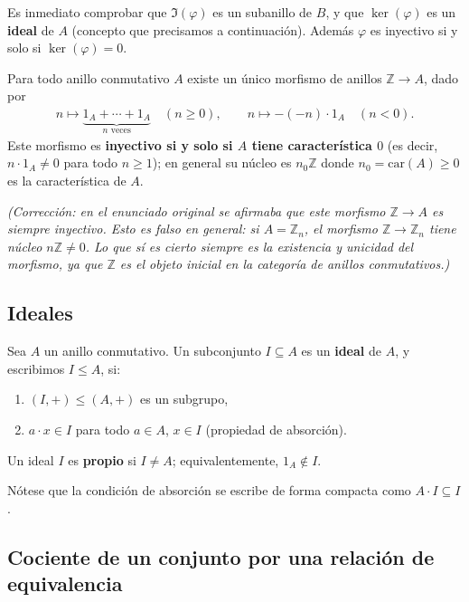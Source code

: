Es inmediato comprobar que $\Im(\varphi)$ es un subanillo de $B$, y que $\ker(\varphi)$ es un \textbf{ideal} de $A$ (concepto que precisamos a continuación). Además $\varphi$ es inyectivo si y solo si $\ker(\varphi)=0$.

\begin{prop}
Para todo anillo conmutativo $A$ existe un único morfismo de anillos $\mathbb{Z}\to A$, dado por
\begin{gather*}
    n \mapsto \underbrace{1_A + \cdots + 1_A}_{n \text{ veces}} \quad (n\geq 0), \qquad
    n \mapsto -(-n)\cdot 1_A \quad (n<0).
\end{gather*}
Este morfismo es \textbf{inyectivo si y solo si $A$ tiene característica $0$} (es decir, $n\cdot 1_A\neq 0$ para todo $n\geq 1$); en general su núcleo es $n_0\mathbb{Z}$ donde $n_0=\mathrm{car}(A)\geq 0$ es la característica de $A$.
\end{prop}

\emph{(Corrección: en el enunciado original se afirmaba que este morfismo $\mathbb{Z}\to A$ es siempre inyectivo. Esto es falso en general: si $A=\mathbb{Z}_n$, el morfismo $\mathbb{Z}\to \mathbb{Z}_n$ tiene núcleo $n\mathbb{Z}\neq 0$. Lo que sí es cierto siempre es la existencia y unicidad del morfismo, ya que $\mathbb{Z}$ es el objeto inicial en la categoría de anillos conmutativos.)}

\subsection{Ideales}

\begin{definicion}
Sea $A$ un anillo conmutativo. Un subconjunto $I\subseteq A$ es un \textbf{ideal} de $A$, y escribimos $I\leq A$, si:
\begin{enumerate}
    \item $(I,+)\leq (A,+)$ es un subgrupo,
    \item $a\cdot x \in I$ para todo $a\in A$, $x\in I$ (propiedad de absorción).
\end{enumerate}
Un ideal $I$ es \textbf{propio} si $I\neq A$; equivalentemente, $1_A\notin I$.
\end{definicion}

Nótese que la condición de absorción se escribe de forma compacta como $A\cdot I \subseteq I$.

\subsection{Cociente de un conjunto por una relación de equivalencia}

